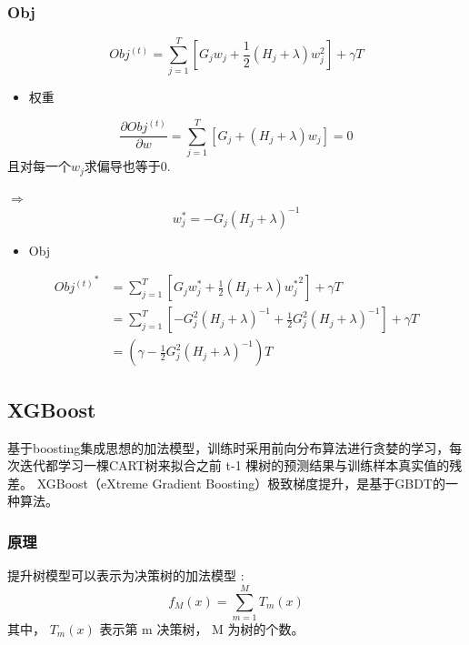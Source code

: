 \documentclass[UTF8,a4paper,AutoFakeBold,AutoFakeSlant]{article}
\begin{document}
\subsubsection{Obj}
\begin{equation*}
  O b j^{(t)}=\sum_{j=1}^{T}\left[G_{j} w_{j}+\frac{1}{2}\left(H_{j}+\lambda\right) w_{j}^{2}\right]+\gamma T
\end{equation*}

\begin{itemize}
  \item 权重
\end{itemize}

\begin{equation*}
    \frac{\partial O b j^{(t)}}{\partial w} = \sum_{j=1}^{T}\left[G_{j}+\left(H_{j}+\lambda\right) w_{j}\right] = 0
\end{equation*}
且对每一个$w_j$求偏导也等于0.

$ \Longrightarrow  $
\begin{equation*}
  w_j^* = -G_j(H_j+\lambda)^{-1}
\end{equation*}

\begin{itemize}
  \item Obj
\end{itemize}

\begin{equation*}
  \begin{aligned}
    {Obj^{(t)}}^* &= \sum_{j=1}^{T}\left[G_{j} {w_{j}^*}+\frac{1}{2}\left(H_{j}+\lambda\right) {w_{j}^*}^{2}\right]+\gamma T\\
    &= \sum_{j=1}^{T}\left[-G_{j}^2 (H_j+\lambda)^{-1}+\frac{1}{2} G_j^2 (H_j+\lambda)^{-1} \right]+\gamma T\\
    &= (\gamma - \frac{1}{2} G_j^2 (H_j+\lambda)^{-1})T
  \end{aligned}
\end{equation*}


\subsection{XGBoost}

基于boosting集成思想的加法模型，训练时采用前向分布算法进行贪婪的学习，每次迭代都学习一棵CART树来拟合之前 t-1 棵树的预测结果与训练样本真实值的残差。
XGBoost（eXtreme Gradient Boosting）极致梯度提升，是基于GBDT的一种算法。


\subsubsection{原理}
提升树模型可以表示为决策树的加法模型 :
$$ f_{M}(x)=\sum_{m=1}^{M} T_{m}(x) $$
其中，  $T_{m}(x)$  表示第  m  决策树，  M  为树的个数。
\end{document}
